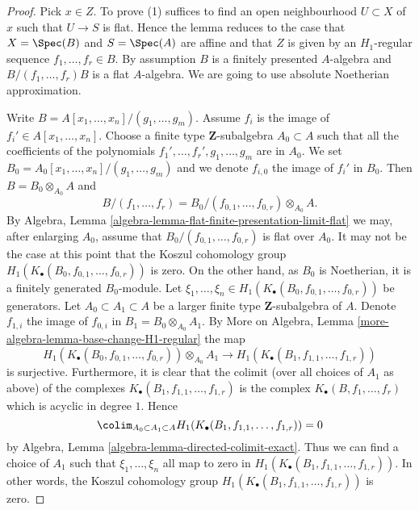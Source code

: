 \begin{proof}
Pick $x \in Z$. To prove (1) suffices to find an open neighbourhood
$U \subset X$ of $x$ such that $U \to S$ is flat. Hence the lemma reduces
to the case that $X = \Spec(B)$ and $S = \Spec(A)$ are affine
and that $Z$ is given by an $H_1$-regular sequence $f_1, \ldots, f_r \in B$.
By assumption $B$ is a finitely presented $A$-algebra and
$B/(f_1, \ldots, f_r)B$ is a flat $A$-algebra. We are going to use
absolute Noetherian approximation.

\medskip\noindent
Write $B = A[x_1, \ldots, x_n]/(g_1, \ldots, g_m)$. Assume
$f_i$ is the image of $f_i' \in A[x_1, \ldots, x_n]$. Choose a finite type
$\mathbf{Z}$-subalgebra $A_0 \subset A$ such that all the coefficients
of the polynomials $f_1', \ldots, f_r', g_1, \ldots, g_m$ are in $A_0$.
We set $B_0 = A_0[x_1, \ldots, x_n]/(g_1, \ldots, g_m)$ and we denote
$f_{i, 0}$ the image of $f_i'$ in $B_0$. Then $B = B_0 \otimes_{A_0} A$
and
$$
B/(f_1, \ldots, f_r) =
B_0/(f_{0, 1}, \ldots, f_{0, r}) \otimes_{A_0} A.
$$
By
Algebra, Lemma \ref{algebra-lemma-flat-finite-presentation-limit-flat}
we may, after enlarging $A_0$, assume that
$B_0/(f_{0, 1}, \ldots, f_{0, r})$ is flat over $A_0$.
It may not be the case at this point that the Koszul cohomology group
$H_1(K_\bullet(B_0, f_{0, 1}, \ldots, f_{0, r}))$ is zero.
On the other hand, as $B_0$ is Noetherian, it is a finitely
generated $B_0$-module. Let
$\xi_1, \ldots, \xi_n \in H_1(K_\bullet(B_0, f_{0, 1}, \ldots, f_{0, r}))$
be generators. Let $A_0 \subset A_1 \subset A$ be a larger finite type
$\mathbf{Z}$-subalgebra of $A$. Denote $f_{1, i}$ the image
of $f_{0, i}$ in $B_1 = B_0 \otimes_{A_0} A_1$. By
More on Algebra, Lemma \ref{more-algebra-lemma-base-change-H1-regular}
the map
$$
H_1(K_\bullet(B_0, f_{0, 1}, \ldots, f_{0, r})) \otimes_{A_0} A_1
\longrightarrow
H_1(K_\bullet(B_1, f_{1, 1}, \ldots, f_{1, r}))
$$
is surjective. Furthermore, it is clear that the colimit (over all
choices of $A_1$ as above) of the
complexes $K_\bullet(B_1, f_{1, 1}, \ldots, f_{1, r})$ is the complex
$K_\bullet(B, f_1, \ldots, f_r)$ which is acyclic in degree $1$. Hence
$$
\colim_{A_0 \subset A_1 \subset A}
H_1(K_\bullet(B_1, f_{1, 1}, \ldots, f_{1, r}))
= 0
$$
by
Algebra, Lemma \ref{algebra-lemma-directed-colimit-exact}.
Thus we can find a choice of $A_1$ such that $\xi_1, \ldots, \xi_n$
all map to zero in $H_1(K_\bullet(B_1, f_{1, 1}, \ldots, f_{1, r}))$.
In other words, the Koszul cohomology group
$H_1(K_\bullet(B_1, f_{1, 1}, \ldots, f_{1, r}))$
is zero.


\end{proof}

